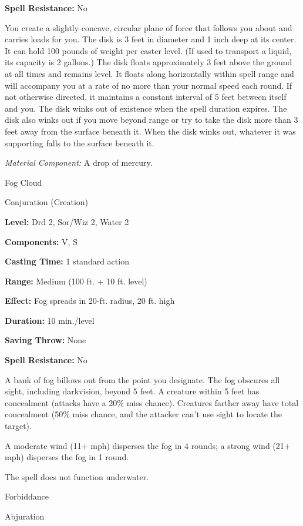 \documentclass{article}
\begin{document}
\textbf{Spell Resistance:} No

You create a slightly concave, circular plane of force that follows you about and 
carries loads for you. The disk is 3 feet in diameter and 1 inch deep at its center. 
It can hold 100 pounds of weight per caster level. (If used to transport a liquid, 
its capacity is 2 gallons.) The disk floats approximately 3 feet above the ground 
at all times and remains level. It floats along horizontally within spell range 
and will accompany you at a rate of no more than your normal speed each round. 
If not otherwise directed, it maintains a constant interval of 5 feet between itself 
and you. The disk winks out of existence when the spell duration expires. The disk 
also winks out if you move beyond range or try to take the disk more than 3 feet 
away from the surface beneath it. When the disk winks out, whatever it was supporting 
falls to the surface beneath it.

\textit{Material Component: }A drop of mercury.

\vspace{12pt}
Fog Cloud

Conjuration (Creation)

\textbf{Level:} Drd 2, Sor/Wiz 2, Water 2

\textbf{Components:} V, S

\textbf{Casting Time:} 1 standard action

\textbf{Range: }Medium (100 ft. + 10 ft. level)

\textbf{Effect:} Fog spreads in 20-ft. radius, 20 ft. high

\textbf{Duration:} 10 min./level

\textbf{Saving Throw:} None

\textbf{Spell Resistance:} No

A bank of fog billows out from the point you designate. The fog obscures all sight, 
including darkvision, beyond 5 feet. A creature within 5 feet has concealment (attacks 
have a 20\% miss chance). Creatures farther away have total concealment (50\% miss 
chance, and the attacker can't use sight to locate the target).

A moderate wind (11+ mph) disperses the fog in 4 rounds; a strong wind (21+ mph) 
disperses the fog in 1 round.

The spell does not function underwater.

\vspace{12pt}
Forbiddance

Abjuration
\end{document}
